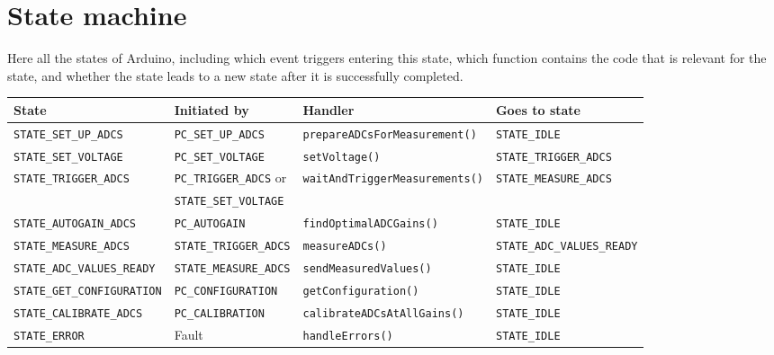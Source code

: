 \documentclass[11pt,a4paper,english]{article}
\begin{document}
\clearpage

\section{State machine}\label{sec:state_machine}
Here all the states of Arduino, including which event triggers entering this state, which function contains the code that is relevant for the state, and whether the state leads to a new state after it is successfully completed.
\begin{center}
\small
\begin{tabular}{llll}\toprule
State					        & Initiated by                 & Handler                            & Goes to state        \\\midrule
\texttt{STATE\_SET\_UP\_ADCS}   & \texttt{PC\_SET\_UP\_ADCS}   & \texttt{prepareADCsForMeasurement()} & \texttt{STATE\_IDLE} \\
\texttt{STATE\_SET\_VOLTAGE}    & \texttt{PC\_SET\_VOLTAGE}    & \texttt{setVoltage()}              & \texttt{STATE\_TRIGGER\_ADCS}\\
\texttt{STATE\_TRIGGER\_ADCS}   & \texttt{PC\_TRIGGER\_ADCS} or & \texttt{waitAndTriggerMeasurements()} & \texttt{STATE\_MEASURE\_ADCS} \\
                                & \texttt{STATE\_SET\_VOLTAGE} &&\\
\texttt{STATE\_AUTOGAIN\_ADCS}  & \texttt{PC\_AUTOGAIN}        & \texttt{findOptimalADCGains()}     & \texttt{STATE\_IDLE} \\
\texttt{STATE\_MEASURE\_ADCS}   & \texttt{STATE\_TRIGGER\_ADCS} & \texttt{measureADCs()}   & \texttt{STATE\_ADC\_VALUES\_READY}\\
\texttt{STATE\_ADC\_VALUES\_READY} & \texttt{STATE\_MEASURE\_ADCS} & \texttt{sendMeasuredValues()}  & \texttt{STATE\_IDLE}\\
\texttt{STATE\_GET\_CONFIGURATION} & \texttt{PC\_CONFIGURATION}    & \texttt{getConfiguration()}    & \texttt{STATE\_IDLE}\\
\texttt{STATE\_CALIBRATE\_ADCS} & \texttt{PC\_CALIBRATION}     & \texttt{calibrateADCsAtAllGains()} & \texttt{STATE\_IDLE}\\
\texttt{STATE\_ERROR}           & Fault                        & \texttt{handleErrors()}            & \texttt{STATE\_IDLE}\\
\bottomrule
\end{tabular}
\end{center}
\end{document}
